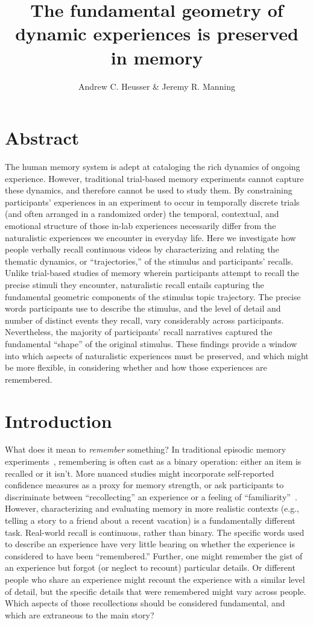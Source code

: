 \documentclass{article}
\title{The fundamental geometry of dynamic experiences is preserved in memory}
\author{Andrew C. Heusser \& Jeremy R. Manning}
\begin{document}
\maketitle

\section{Abstract}
{
The human memory system is adept at cataloging the rich dynamics of ongoing experience. However, traditional trial-based memory experiments cannot capture these dynamics, and therefore cannot be used to study them.  By constraining participants' experiences in an experiment to occur in temporally discrete trials (and often arranged in a randomized order) the temporal, contextual, and emotional structure of those in-lab experiences necessarily differ from the naturalistic experiences we encounter in everyday life.  Here we investigate how people verbally recall continuous videos by characterizing and relating the thematic dynamics, or ``trajectories,'' of the stimulus and participants' recalls.  Unlike trial-based studies of memory wherein participants attempt to recall the precise stimuli they encounter, naturalistic recall entails capturing the fundamental geometric components of the stimulus topic trajectory.  The precise words participants use to describe the stimulus, and the level of detail and number of distinct events they recall, vary considerably across participants.  Nevertheless, the majority of participants' recall narratives captured the fundamental ``shape'' of the original stimulus.  These findings provide a window into which aspects of naturalistic experiences must be preserved, and which might be more flexible, in considering whether and how those experiences are remembered.

\section{Introduction}

What does it mean to \textit{remember} something? In traditional episodic memory experiments~\citep[e.g., list-learning or trial-based experiments;][]{Murd62a, Kaha96}, remembering is often cast as a binary operation: either an item is recalled or it isn't. More nuanced studies might incorporate self-reported confidence measures as a proxy for memory strength, or ask participants to discriminate between ``recollecting'' an experience or a feeling of ``familiarity''~\citep{Yone02}. However, characterizing and evaluating memory in more realistic contexts (e.g., telling a story to a friend about a recent vacation) is a fundamentally different task. Real-world recall is continuous, rather than binary.  The specific words used to describe an experience have very little bearing on whether the experience is considered to have been ``remembered.''  Further, one might remember the gist of an experience but forgot (or neglect to recount) particular details.  Or different people who share an experience might recount the experience with a similar level of detail, but the specific details that were remembered might vary across people.  Which aspects of those recollections should be considered fundamental, and which are extraneous to the main story?

}
\end{document}
